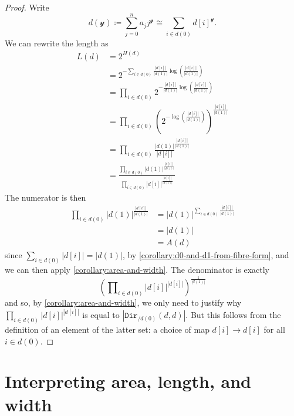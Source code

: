 \documentclass[11pt,fleqn]{article}
\newcommand{\yon}{\mathcal{y}}
\newcommand{\cat}[1]{\mathtt{#1}}
\newcommand{\cDir}{\cat{Dir}}
\begin{document}
\begin{proof}
  Write
  \[
    d(\yon) \coloneqq \sum_{j=0}^n a_j j^\yon \cong \sum_{i\in d(0)}d[i]^\yon.
  \]
  We can rewrite the length as
  \[
    \begin{aligned}
      L(d)
      &= 2^{H(d)}
    \\&= 2^{-\sum_{i\in d(0)}\frac{|d[i]|}{|d(1)|}\log\left(\frac{|d[i]|}{|d(1)|}\right)}
    \\&= \prod_{i\in d(0)} 2^{-\frac{|d[i]|}{|d(1)|}\log\left(\frac{|d[i]|}{|d(1)|}\right)}
    \\&= \prod_{i\in d(0)} \left(2^{-\log\left(\frac{|d[i]|}{|d(1)|}\right)}\right)^{\frac{|d[i]|}{|d(1)|}}
    \\&= \prod_{i\in d(0)} \frac{|d(1)|}{|d[i]|}^{\frac{|d[i]|}{|d(1)|}}
    \\&= \frac{\prod_{i\in d(0)} |d(1)|^{\frac{|d[i]|}{|d(1)|}}}{\prod_{i\in d(0)} |d[i]|^{\frac{|d[i]|}{|d(1)|}}}
    \end{aligned}
  \]
  The numerator is then
  \[
    \begin{aligned}
      \prod\nolimits_{i\in d(0)} |d(1)|^{\frac{|d[i]|}{|d(1)|}}
      &= |d(1)|^{\sum_{i\in d(0)}\frac{|d[i]|}{|d(1)|}}
    \\&= |d(1)|
    \\&= A(d)
    \end{aligned}
  \]
  since $\sum_{i\in d(0)}|d[i]|=|d(1)|$, by \cref{corollary:d0-and-d1-from-fibre-form}, and we can then apply \cref{corollary:area-and-width}.
  The denominator is exactly
  \[
    \left(\prod\nolimits_{i\in d(0)} |d[i]|^{|d[i]|}\right)^{\frac{1}{|d(1)|}}
  \]
  and so, by \cref{corollary:area-and-width}, we only need to justify why $\prod_{i\in d(0)}|d[i]|^{|d[i]|}$ is equal to $|\cDir_{/d(0)}(d,d)|$.
  But this follows from the definition of an element of the latter set: a choice of map $d[i]\to d[i]$ for all $i\in d(0)$.
\end{proof}


\section{Interpreting area, length, and width}
\label{section:understanding-the-numbers}
\end{document}
